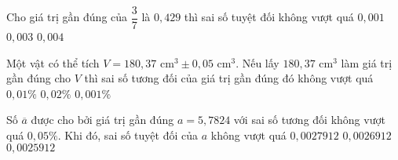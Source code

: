 

\begin{ex}%
	Cho giá trị gần đúng của $\dfrac{3}{7}$ là $0{,}429$ thì sai số tuyệt đối không vượt quá 
	{\True $0{,}001$}
	{$ 0{,}003$}
	{$0{,}004$}
\end{ex}

\begin{ex}%
	Một vật có thể tích $V = 180{,}37 \text{\ cm}^3 \pm 0,05 \text{\ cm}^3$. Nếu lấy $180{,}37 \text{\ cm}^3$ làm giá trị gần đúng cho $V$ thì sai số tương đối của giá trị gần đúng đó không vượt quá 
	{$0{,}01 \%$}
	{$0{,}02 \%$}
	{$0{,}001 \%$}
\end{ex}

\begin{ex}%
	Số $\overline{a}$ được cho bởi giá trị gần đúng $a = 5{,}7824$ với sai số tương đối không vượt quá $0{,}05\%$. Khi đó, sai số tuyệt đối của $a$ không vượt quá
	{$0{,}0027912$}
	{$0{,}0026912$}
	{$0{,}0025912$}
\end{ex}

